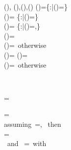 \begin{RuleFrame}%
\begin{MDefinition}{\complete(\varEnv),
\mutableVars(\varEnv),\mutableSuper(\varEnv),\mutableToLent(\T)}
\complete(\varEnv)=\{\x:\Type\mdf\Path{}|\varEnv(\x)=\Type\mdf\Path{}\}\\
\mutableVars(\varEnv)=
\{\x:\Type\SMdf\Path\ph|\varEnv(\x)=\Type\SMdf\Path\ph\}\\
\mutableSuper(\varEnv)=
\{\x:\Type\mdf\Path\ph|\varEnv(\x)=\Type\mdf\Path\ph,\SMdf\leq\mdf\}\\
\mutableToLent(\Type\SMdf\Path\ph)=\Type\LMdf\Path\ph\\
\mutableToLent(\Type\mdf\Path\ph)=\Type\mdf\Path\ph\mbox{ otherwise}\\
\mutableAndLentToReadable(\Type\SMdf\Path\ph)=
\mutableAndLentToReadable(\Type\LMdf\Path\ph)=
\Type\RMdf\Path\ph\\
\mutableAndLentToReadable(\Type\mdf\Path\ph)=\Type\mdf\Path\ph\mbox{ otherwise}\\
\end{MDefinition}

%
\\
\begin{MDefinition}{
\Move{\ctxVal}{\xs}\!=\!
}

\Move{\hole}{\xs}=\Pair{\hole}{\emptyset}\\
\mbox{assuming }\Move{\ctxVal}{\xs}=, \mbox{ then}\\

\Move{\Vd{\dvs\ \Dec\T\y\ctxVal\decs}{\Opt\catch}{\e}}\xs
=\emptyset
\\
\mbox{ and }
\Move{\Vd{\dvs}{}{\ctxVal}}{\xs}
=\emptyset\mbox{ with }\xs\subseteq\Dom\dvs\\



\end{MDefinition}
\end{RuleFrame}
